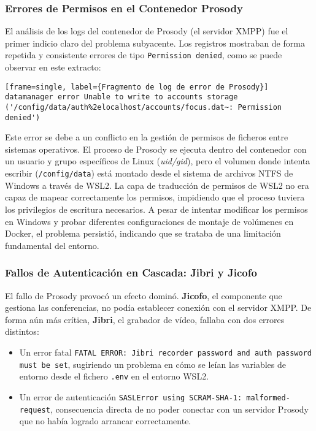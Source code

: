 \subsubsection{Errores de Permisos en el Contenedor Prosody}
El análisis de los logs del contenedor de Prosody (el servidor XMPP) fue el primer indicio claro del problema subyacente. Los registros mostraban de forma repetida y consistente errores de tipo \texttt{Permission denied}, como se puede observar en este extracto:
\begin{verbatim}[frame=single, label={Fragmento de log de error de Prosody}]
datamanager error Unable to write to accounts storage 
('/config/data/auth%2elocalhost/accounts/focus.dat~: Permission denied')
\end{verbatim}
Este error se debe a un conflicto en la gestión de permisos de ficheros entre sistemas operativos. El proceso de Prosody se ejecuta dentro del contenedor con un usuario y grupo específicos de Linux (\textit{uid/gid}), pero el volumen donde intenta escribir (\texttt{/config/data}) está montado desde el sistema de archivos NTFS de Windows a través de WSL2. La capa de traducción de permisos de WSL2 no era capaz de mapear correctamente los permisos, impidiendo que el proceso tuviera los privilegios de escritura necesarios. A pesar de intentar modificar los permisos en Windows y probar diferentes configuraciones de montaje de volúmenes en Docker, el problema persistió, indicando que se trataba de una limitación fundamental del entorno.

\subsubsection{Fallos de Autenticación en Cascada: Jibri y Jicofo}
El fallo de Prosody provocó un efecto dominó. \textbf{Jicofo}, el componente que gestiona las conferencias, no podía establecer conexión con el servidor XMPP. De forma aún más crítica, \textbf{Jibri}, el grabador de vídeo, fallaba con dos errores distintos:
\begin{itemize}
    \item Un error fatal \texttt{FATAL ERROR: Jibri recorder password and auth password must be set}, sugiriendo un problema en cómo se leían las variables de entorno desde el fichero \texttt{.env} en el entorno WSL2.
    \item Un error de autenticación \texttt{SASLError using SCRAM-SHA-1: malformed-request}, consecuencia directa de no poder conectar con un servidor Prosody que no había logrado arrancar correctamente.
\end{itemize}

